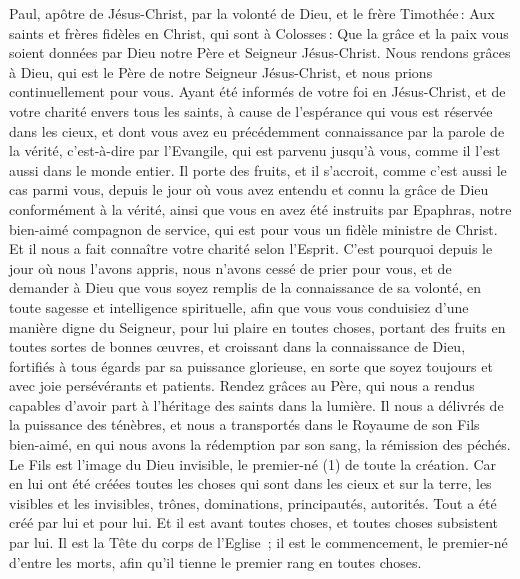 \BFont
\begin{multicols}{2}
\TextTitle{[Salutation]}
\VerseOne{}Paul, apôtre de Jésus-Christ, par la volonté de Dieu, et le frère Timothée :
Aux saints et frères fidèles en Christ, qui sont à Colosses : Que la grâce et la paix vous soient données par Dieu notre Père et Seigneur Jésus-Christ.
Nous rendons grâces à Dieu, qui est le Père de notre Seigneur Jésus-Christ, et nous prions continuellement pour vous.
Ayant été informés de votre foi en Jésus-Christ, et de votre charité envers tous les saints,
à cause de l'espérance qui vous est réservée dans les cieux, et dont vous avez eu précédemment connaissance par la parole de la vérité, c'est-à-dire par l'Evangile,
qui est parvenu jusqu'à vous, comme il l'est aussi dans le monde entier. Il porte des fruits, et il s’accroit, comme c’est aussi le cas parmi vous, depuis le jour où vous avez entendu et connu la grâce de Dieu conformément à la vérité,
ainsi que vous en avez été instruits par Epaphras, notre bien-aimé compagnon de service, qui est pour vous un fidèle ministre de Christ.
Et il nous a fait connaître votre charité selon l’Esprit.
C'est pourquoi depuis le jour où nous l’avons appris, nous n’avons cessé de prier pour vous, et de demander à Dieu que vous soyez remplis de la connaissance de sa volonté, en toute sagesse et intelligence spirituelle,
afin que vous vous conduisiez d’une manière digne du Seigneur, pour lui plaire en toutes choses, portant des fruits en toutes sortes de bonnes œuvres, et croissant dans la connaissance de Dieu,
fortifiés à tous égards par sa puissance glorieuse, en sorte que soyez toujours et avec joie persévérants et patients.
Rendez grâces au Père, qui nous a rendus capables d’avoir part à l'héritage des saints dans la lumière.
Il nous a délivrés de la puissance des ténèbres, et nous a transportés dans le Royaume de son Fils bien-aimé,
en qui nous avons la rédemption par son sang, la rémission des péchés.
Le Fils est l'image du Dieu invisible, le premier-né (1) de toute la création.
Car en lui ont été créées toutes les choses qui sont dans les cieux et sur la terre, les visibles et les invisibles, trônes, dominations, principautés, autorités. Tout a été créé par lui et pour lui.
Et il est avant toutes choses, et toutes choses subsistent par lui.
Il est la Tête du corps de l'Eglise ; il est le commencement, le premier-né d'entre les morts, afin qu'il tienne le premier rang en toutes choses.

\end{multicols}
